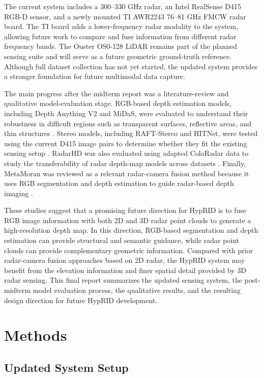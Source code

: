 \documentclass[conference]{IEEEtran}
\begin{document}
The current system includes a 300--330 GHz radar, an Intel RealSense D415 RGB-D sensor, and a newly mounted TI AWR2243 76--81 GHz FMCW radar board. The TI board adds a lower-frequency radar modality to the system, allowing future work to compare and fuse information from different radar frequency bands. The Ouster OS0-128 LiDAR remains part of the planned sensing suite and will serve as a future geometric ground-truth reference. Although full dataset collection has not yet started, the updated system provides a stronger foundation for future multimodal data capture.

The main progress after the midterm report was a literature-review and qualitative model-evaluation stage. RGB-based depth estimation models, including Depth Anything V2 and MiDaS, were evaluated to understand their robustness in difficult regions such as transparent surfaces, reflective areas, and thin structures \cite{yang2024depthanythingv2,ranftl2022towards}. Stereo models, including RAFT-Stereo and HITNet, were tested using the current D415 image pairs to determine whether they fit the existing sensing setup \cite{lipson2021raft,tankovich2021hitnet}. RadarHD was also evaluated using adapted ColoRadar data to study the transferability of radar depth-map models across datasets \cite{prabhakara2023high,kramer2022coloradar}. Finally, MetaMoran was reviewed as a relevant radar-camera fusion method because it uses RGB segmentation and depth estimation to guide radar-based depth imaging \cite{prabhakara2022metamoran}.

These studies suggest that a promising future direction for HypRID is to fuse RGB image information with both 2D and 3D radar point clouds to generate a high-resolution depth map. In this direction, RGB-based segmentation and depth estimation can provide structural and semantic guidance, while radar point clouds can provide complementary geometric information. Compared with prior radar-camera fusion approaches based on 2D radar, the HypRID system may benefit from the elevation information and finer spatial detail provided by 3D radar sensing. This final report summarizes the updated sensing system, the post-midterm model evaluation process, the qualitative results, and the resulting design direction for future HypRID development.

\section{Methods}

\subsection{Updated System Setup}
\end{document}
